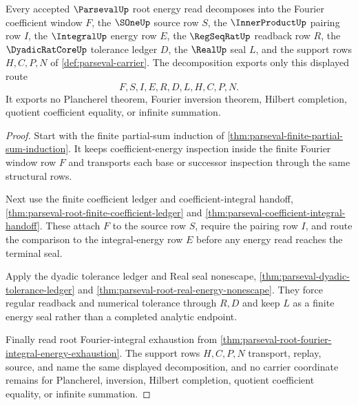 \begin{theorem}
\label{thm:parseval-root-energy-decomposition}
Every accepted $\ParsevalUp$ root energy read decomposes into the Fourier coefficient window $F$, the $\SOneUp$ source row $S$, the $\InnerProductUp$ pairing row $I$, the $\IntegralUp$ energy row $E$, the $\RegSeqRatUp$ readback row $R$, the $\DyadicRatCoreUp$ tolerance ledger $D$, the $\RealUp$ seal $L$, and the support rows $H,C,P,N$ of \autoref{def:parseval-carrier}. The decomposition exports only this displayed route
$$
F,S,I,E,R,D,L,H,C,P,N .
$$
It exports no Plancherel theorem, Fourier inversion theorem, Hilbert completion, quotient coefficient equality, or infinite summation.
\end{theorem}
\begin{proof}
Start with the finite partial-sum induction of \autoref{thm:parseval-finite-partial-sum-induction}. It keeps coefficient-energy inspection inside the finite Fourier window row $F$ and transports each base or successor inspection through the same structural rows.

Next use the finite coefficient ledger and coefficient-integral handoff, \autoref{thm:parseval-root-finite-coefficient-ledger} and \autoref{thm:parseval-coefficient-integral-handoff}. These attach $F$ to the source row $S$, require the pairing row $I$, and route the comparison to the integral-energy row $E$ before any energy read reaches the terminal seal.

Apply the dyadic tolerance ledger and Real seal nonescape, \autoref{thm:parseval-dyadic-tolerance-ledger} and \autoref{thm:parseval-root-real-energy-nonescape}. They force regular readback and numerical tolerance through $R,D$ and keep $L$ as a finite energy seal rather than a completed analytic endpoint.

Finally read root Fourier-integral exhaustion from \autoref{thm:parseval-root-fourier-integral-energy-exhaustion}. The support rows $H,C,P,N$ transport, replay, source, and name the same displayed decomposition, and no carrier coordinate remains for Plancherel, inversion, Hilbert completion, quotient coefficient equality, or infinite summation.
\end{proof}

